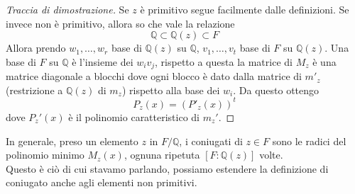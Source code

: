 \begin{proof}[Traccia di dimostrazione]
	Se $z$ è primitivo segue facilmente dalle definizioni. Se invece non è primitivo, allora so che vale la relazione 
	\begin{equation*}
	\mathbb{Q}\subset \mathbb{Q}(z)\subset F
	\end{equation*}
	Allora prendo $w_1,\dots,w_r$ base di $\mathbb{Q}(z)$ su $\mathbb{Q}$, $v_1,\dots,v_t$ base di $F$ su $\mathbb{Q}(z)$. Una base di $F$ su $\mathbb{Q}$ è l'insieme dei $w_iv_j$, rispetto a questa la matrice di $M_z$ è una matrice diagonale a blocchi dove ogni blocco è dato dalla matrice di $m'_z$ (restrizione a $\mathbb{Q}(z)$ di $m_z$) rispetto alla base dei $w_i$. Da questo ottengo 
	\begin{equation*}
	P_z(x)=\left(P'_z(x)\right)^t
	\end{equation*}
	dove $P_z'(x)$ è il polinomio caratteristico di $m_z'$.
\end{proof}
\begin{osservazione}
	In generale, preso un elemento $z$ in $F/\mathbb{Q}$, i coniugati di $z\in F$ sono le radici del polinomio minimo $M_z(x)$, ognuna ripetuta $[F:\mathbb{Q}(z)]$ volte. \\ Questo è ciò di cui stavamo parlando, possiamo estendere la definizione di coniugato anche agli elementi non primitivi.
\end{osservazione}






